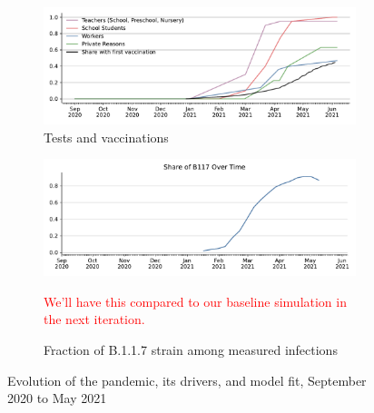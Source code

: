 \begin{figure}[!tp]
\begin{subfigure}[b]{0.475\textwidth}
        \includegraphics[width=\textwidth]{../figures/results/figures/data/testing/rapid_test_demand_shares}

        \caption{{\small Tests and vaccinations}}
        \label{fig:antigen_tests_vaccinations}
    \end{subfigure}
    \hfill
    \begin{subfigure}[b]{0.475\textwidth}
        \centering
        \includegraphics[width=\textwidth]{../figures/results/figures/data/share_of_b117_acc_to_rki}

        \caption{Fraction of B.1.1.7 strain among measured infections}

        \textcolor{red}{We'll have this compared to our baseline simulation in the next
        iteration.}
        \label{fig:share_b117}
    \end{subfigure}

    \caption{Evolution of the pandemic, its drivers, and model fit, September 2020 to May 2021}
    \label{fig:pandemic_drivers_model_fit}


\end{figure}

